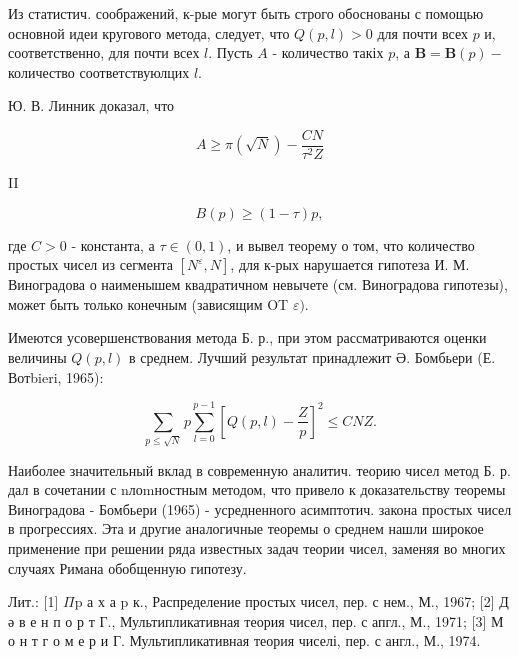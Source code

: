 \documentclass[10pt]{article}
\begin{document}
Из статистич. соображений, к-рые могут быть строго обоснованы с помощью основной идеи кругового метода, следует, что $Q(p, l)>0$ для почти всех $p$ и, соответственно, для почти всех $l$. Пусть $A$ - количество такіх $p$, а $\boldsymbol{B}=\boldsymbol{B}(p)-$ количество соответствуюлцих $l$.



Ю. В. Линник доказал, что



\[

A \geqslant \pi(\sqrt{N})-\frac{C N}{\tau^{2} Z}

\]



II



\[

B(p) \geqslant(1-\tau) p,

\]



где $C>0$ - константа, а $\tau \in(0,1)$, и вывел теорему о том, что количество простых чисел из сегмента $\left[N^{\varepsilon}, N\right]$, для к-рых нарушается гипотеза И. М. Виноградова о наименышем квадратичном невычете (см. Виноградова гипотезы), может быть только конечным (зависящим OT $\varepsilon)$.



Имеются усовершенствования метода Б. р., при этом рассматриваются оценки величины $Q(p, l)$ в среднем. Лучший результат принадлежит Ә. Бомбьери (Е. Вотbieri, 1965):



\[

\sum_{p \leqslant \sqrt{N}} p \sum_{l=0}^{p-1}\left[Q(p, l)-\frac{Z}{p}\right]^{2} \leqslant C N Z .

\]



Наиболее значительный вклад в современную аналитич. теорию чисел метод Б. р. дал в сочетании с nлоmностным методом, что привело к доказательству теоремы Виноградова - Бомбьери (1965) - усредненного асимптотич. закона простых чисел в прогрессиях. Эта и другие аналогичные теоремы о среднем нашли широкое применение при решении ряда известных задач теории чисел, заменяя во многих случаях Римана обобщенную гипотезу.



Лит.: [1] $\Pi \mathrm{p}$ а х а $\mathrm{p}$ к., Распределение простых чисел, пер. с нем., М., 1967; [2] Д ә в е н п о р т Г., Мультипликативная теория чисел, пер. с апгл., М., 1971; [3] М о н т г о м е р и Г. Мультипликативная теория чиселі, пер. с англ., М., 1974.
\end{document}
